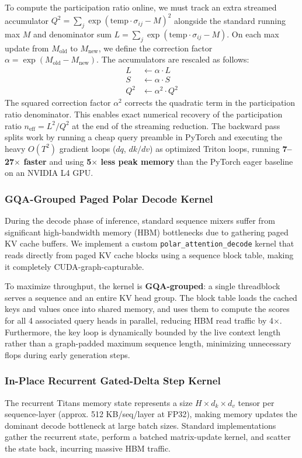 \documentclass{article} %
\begin{document}
To compute the participation ratio online, we must track an extra streamed accumulator $Q^2 = \sum_j \exp(\mathrm{temp} \cdot \sigma_{ij} - M)^2$ alongside the standard running max $M$ and denominator sum $L = \sum_j \exp(\mathrm{temp} \cdot \sigma_{ij} - M)$. On each max update from $M_{\text{old}}$ to $M_{\text{new}}$, we define the correction factor $\alpha = \exp(M_{\text{old}} - M_{\text{new}})$. The accumulators are rescaled as follows:
\begin{align}
    L &\leftarrow \alpha \cdot L \\
    S &\leftarrow \alpha \cdot S \\
    Q^2 &\leftarrow \alpha^2 \cdot Q^2
\end{align}
The squared correction factor $\alpha^2$ corrects the quadratic term in the participation ratio denominator. This enables exact numerical recovery of the participation ratio $n_{\text{eff}} = L^2 / Q^2$ at the end of the streaming reduction. The backward pass splits work by running a cheap query preamble in PyTorch and executing the heavy $O(T^2)$ gradient loops ($dq$, $dk/dv$) as optimized Triton loops, running \textbf{7--27$\times$ faster} and using \textbf{5$\times$ less peak memory} than the PyTorch eager baseline on an NVIDIA L4 GPU.

\subsubsection{GQA-Grouped Paged Polar Decode Kernel}
During the decode phase of inference, standard sequence mixers suffer from significant high-bandwidth memory (HBM) bottlenecks due to gathering paged KV cache buffers. We implement a custom \texttt{polar\_attention\_decode} kernel that reads directly from paged KV cache blocks using a sequence block table, making it completely CUDA-graph-capturable.

To maximize throughput, the kernel is \textbf{GQA-grouped}: a single threadblock serves a sequence and an entire KV head group. The block table loads the cached keys and values once into shared memory, and uses them to compute the scores for all 4 associated query heads in parallel, reducing HBM read traffic by 4$\times$. Furthermore, the key loop is dynamically bounded by the live context length rather than a graph-padded maximum sequence length, minimizing unnecessary flops during early generation steps.

\subsubsection{In-Place Recurrent Gated-Delta Step Kernel}
The recurrent Titans memory state represents a size $H \times d_k \times d_v$ tensor per sequence-layer (approx. 512 KB/seq/layer at FP32), making memory updates the dominant decode bottleneck at large batch sizes. Standard implementations gather the recurrent state, perform a batched matrix-update kernel, and scatter the state back, incurring massive HBM traffic.
\end{document}
